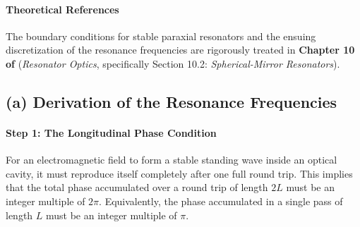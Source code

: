 \begin{resolucao}[Solution]

    \paragraph*{Theoretical References}
    The boundary conditions for stable paraxial resonators and the ensuing discretization of the resonance frequencies are rigorously treated in \textbf{Chapter 10 of } (\textit{Resonator Optics}, specifically Section 10.2: \textit{Spherical-Mirror Resonators}). 

    \subsection*{(a) Derivation of the Resonance Frequencies}

        \paragraph*{Step 1: The Longitudinal Phase Condition}
            For an electromagnetic field to form a stable standing wave inside an optical cavity, it must reproduce itself completely after one full round trip. This implies that the total phase accumulated over a round trip of length $2L$ must be an integer multiple of $2\pi$. Equivalently, the phase accumulated in a single pass of length $L$ must be an integer multiple of $\pi$.
        

\end{resolucao}
